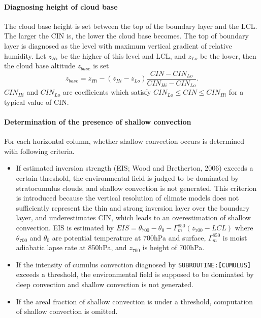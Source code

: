 \paragraph{Diagnosing height of cloud base}\label{diagno-height-of-cloud-base}

The cloud base height is set between the top of the boundary layer and the LCL. The larger the CIN is, the lower the cloud base becomes.
The top of boundary layer is diagnosed as the level with maximum vertical gradient of relative humidity. 
Let $z_{Hi}$ be the higher of this level and LCL, and $z_{Lo}$ be the lower, then the cloud base altitude $z_{base}$ is set
\begin{equation}\label{zbase}
    z_{base} = z_{Hi} - (z_{Hi}-z_{Lo})\frac{CIN-CIN_{Lo}}{CIN_{Hi} - CIN_{Lo}}.
\end{equation}
$CIN_{Hi}$ and $CIN_{Lo}$ are coefficients which satisfy $CIN_{Lo}\le CIN \le CIN_{Hi}$ for a typical value of CIN.

\paragraph{Determination of the presence of shallow convection}\label{presence-of-shallow-convection}

For each horizontal column, whether shallow convection occurs is determined with following criteria.
\begin{itemize}
    \item If estimated inversion strength (EIS; Wood and Bretherton, 2006) exceeds a certain threshold,
    the environmental field is judged to be dominated by stratocumulus clouds, and shallow convection is not generated.
    This criterion is introduced because the vertical resolution of climate models does not sufficiently represent the thin and strong inversion layer over the boundary layer,
    and underestimates CIN, which leads to an overestimation of shallow convection.
    EIS is estimated by
     $EIS=\theta_{700}-\theta_{0}-\Gamma_m^{850}(z_{700}-LCL)$
    where $\theta_{700}$ and $\theta_0$ are potential temperature at 700hPa and surface, $\Gamma_m^{850}$ is moist adiabatic lapse rate at 850hPa, 
    and $z_{700}$ is height of 700hPa.
    \item If the intensity of cumulus convection diagnosed by \texttt{SUBROUTINE:[CUMULUS]} exceeds a threshold, the environmental 
    field is supposed to be dominated by deep convection and shallow convection is not generated.
    \item If the areal fraction of shallow convection is under a threshold, computation of shallow convection is omitted.
 \end{itemize}

